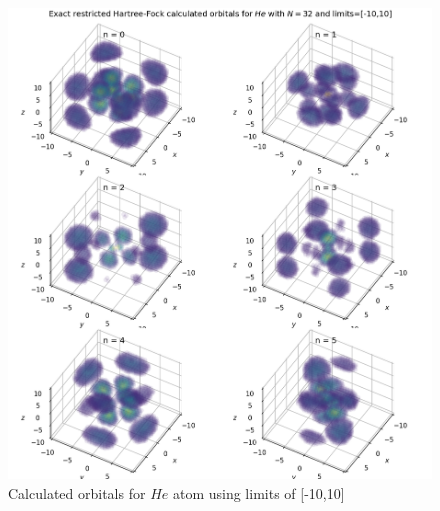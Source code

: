 \documentclass[10pt, oneside, letterpaper]{article}
\begin{document}
\begin{figure}[H]
  \begin{center}
    \includegraphics[scale=0.75]{he_N32_l10.png}
  \end{center}
  \caption{Calculated orbitals for $He$ atom using limits of [-10,10]}
  \label{he-plot-l10}
\end{figure}
\end{document}
